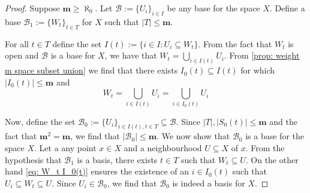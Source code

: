 \begin{proof}
  Suppose \(\mathbf m \geq \aleph_0\). Let \(\mathcal B := \{U_i\}_{i \in I}\) 
  be any base for the space \(X\). Define a base \(\mathcal B_1 := \{W_t\}_{t
  \in T}\) for \(X\) such that \(|T| \leq \mathbf m\).

  For all \(t \in T\) define the set \(I(t) := \{i \in I : U_i \subseteq
  W_t\}\). From the fact that \(W_t\) is open and \(\mathcal B\) is a base for
  \(X\), we have that \(W_t = \bigcup_{i \in  I(t)} U_i\).  From \cref{prop:
  weight m space subset union} we find that there exists \(I_0(t) \subseteq
  I(t)\) for which \(|I_0(t)| \leq \mathbf m\) and 
  \begin{equation}\label{eq: W_t I_0(t)}
    W_t = \bigcup_{i \in  I(t)} U_i = \bigcup_{i \in  I_0(t)} U_i
  \end{equation}

  Now, define the set \(\mathcal B_0 := \{U_i\}_{i \in I(t), t \in T} \subseteq
  \mathcal B\). Since \(|T|, |S_0(t)| \leq \mathbf m\) and the fact that
  \(\mathbf m^2 = \mathbf m\), we find that \(|\mathcal B_0| \leq \mathbf m\).
  We now show that \(\mathcal B_0\) is a base for the space \(X\). Let a any
  point \(x \in X\) and a neighbourhood \(U \subseteq X\) of \(x\). From the
  hypothesis that \(\mathcal B_1\) is a basis, there exists \(t \in T\) such
  that \(W_t \subseteq U\). On the other hand \cref{eq: W_t I_0(t)} ensures the
  existence of an \(i \in I_0(t)\) such that \(U_i \subseteq W_t \subseteq U\).
  Since \(U_i \in \mathcal B_0\), we find that \(\mathcal B_0\) is indeed a
  basis for \(X\).
\end{proof}
